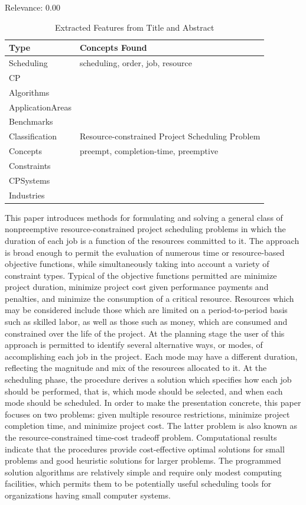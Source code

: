 Relevance:  0.00

{\scriptsize
\begin{longtable}{p{2cm}p{20cm}}
\caption{Extracted Features from Title and Abstract}\\ \toprule
Type & Concepts Found\\ \midrule
\endhead
\bottomrule
\endfoot
Scheduling & scheduling, order, job, resource\\ 
CP & \\ 
Algorithms & \\ 
ApplicationAreas & \\ 
Benchmarks & \\ 
Classification & Resource-constrained Project Scheduling Problem\\ 
Concepts & preempt, completion-time, preemptive\\ 
Constraints & \\ 
CPSystems & \\ 
Industries & \\ 
\end{longtable}
}

  This paper introduces methods for formulating and solving a general class of nonpreemptive resource-constrained project scheduling problems in which the duration of each job is a function of the resources committed to it. The approach is broad enough to permit the evaluation of numerous time or resource-based objective functions, while simultaneously taking into account a variety of constraint types. Typical of the objective functions permitted are minimize project duration, minimize project cost given performance payments and penalties, and minimize the consumption of a critical resource. Resources which may be considered include those which are limited on a period-to-period basis such as skilled labor, as well as those such as money, which are consumed and constrained over the life of the project. At the planning stage the user of this approach is permitted to identify several alternative ways, or modes, of accomplishing each job in the project. Each mode may have a different duration, reflecting the magnitude and mix of the resources allocated to it. At the scheduling phase, the procedure derives a solution which specifies how each job should be performed, that is, which mode should be selected, and when each mode should be scheduled. In order to make the presentation concrete, this paper focuses on two problems: given multiple resource restrictions, minimize project completion time, and minimize project cost. The latter problem is also known as the resource-constrained time-cost tradeoff problem.    Computational results indicate that the procedures provide cost-effective optimal solutions for small problems and good heuristic solutions for larger problems. The programmed solution algorithms are relatively simple and require only modest computing facilities, which permits them to be potentially useful scheduling tools for organizations having small computer systems.  

